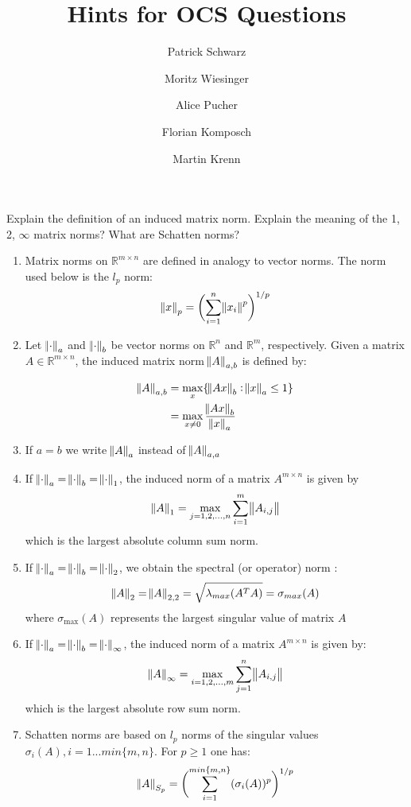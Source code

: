 \documentclass[12pt,a4paper]{article}
\title{Hints for OCS Questions}
\author{ Patrick Schwarz 
    \and Moritz Wiesinger
    \and Alice Pucher
    \and Florian Komposch
    \and Martin Krenn
    }
\begin{document}
\maketitle

\begin{question}
Explain the definition of an induced matrix norm. Explain the meaning of the 1, 2, $\infty$ matrix norms? What are Schatten norms?
\end{question}

\begin{enumerate}[(1)]
    \item Matrix norms on $ \mathbb{R}^{m \times n}$ are defined in analogy to vector norms. The norm used below is the $l_p$ norm:
    \begin{equation*}
     \norm{x}_p = \biggl( \sum_{i=1}^n \norm{x_i}^p \biggr)^{1/p}
    \end{equation*}
    \item Let $ \norm{\cdot}_a$ and $ \norm{\cdot}_b$ be vector norms on $\mathbb{R}^n$ and $\mathbb{R}^m$, respectively. Given a matrix $A\in\mathbb{R}^{m \times n}$, the induced matrix norm $\norm{A}_{a,b}$ is defined by:
    
    \begin{align}
    \norm{A}_{a,b} &= \max_x\{\norm{Ax}_b : \norm{x}_a \leq 1\}\\  &= \max_{x\neq 0} \frac{\norm{Ax}_b}{\norm{x}_a}
    \end{align}
    \item If $a=b$ we write $\norm{A}_a$ instead of $\norm{A}_{a,a}$ 
    \item If  $ \norm{\cdot}_a = \norm{\cdot}_b = \norm{\cdot}_1$, the induced norm of a matrix $A^{m \times n}$ is given by 
    \begin{equation*}
    \norm{A}_1 = \max_{j=1,2,...,n} \sum_{i=1}^m \norm{A_{i,j}} 
    \end{equation*}
    which is the largest absolute column sum norm.
    \item If  $ \norm{\cdot}_a = \norm{\cdot}_b = \norm{\cdot}_2$, we obtain the spectral (or operator) norm :
    \begin{equation*}
    \norm{A}_2 = \norm{A}_{2,2} = \sqrt{\lambda_{max}(A^TA)} = \sigma_{max}(A) 
    \end{equation*}
    where $ \sigma _{\max }(A)$ represents the largest singular value of matrix $A$
    \item If  $ \norm{\cdot}_a = \norm{\cdot}_b = \norm{\cdot}_{\infty}$, the induced norm of a matrix $A^{m \times n}$ is given by:
    \begin{equation*}
    \norm{A}_{\infty} = \max_{i=1,2,...,m} \sum_{j=1}^n \norm{A_{i,j}} 
    \end{equation*}
    which is the largest absolute row sum norm.
    \item Schatten norms are based on $l_p$ norms of the singular values $\sigma_i(A), i = 1...min\{m,n\}$. For $p\geq 1 $ one has:
    \begin{equation*}
    \norm{A}_{S_p} = \biggl(\sum_{i=1}^{min\{m,n\}} (\sigma_i(A))^p\biggr) ^{1/p}
    \end{equation*}
\end{enumerate}
\end{document}
